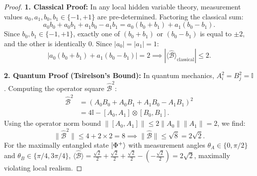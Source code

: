 \begin{proof}
\textbf{1. Classical Proof:}
In any local hidden variable theory, measurement values $a_0, a_1, b_0, b_1 \in \{-1, +1\}$ are pre-determined. Factoring the classical sum:
\begin{equation}
    a_0 b_0 + a_0 b_1 + a_1 b_0 - a_1 b_1 = a_0(b_0 + b_1) + a_1(b_0 - b_1).
\end{equation}
Since $b_0, b_1 \in \{-1, +1\}$, exactly one of $(b_0 + b_1)$ or $(b_0 - b_1)$ is equal to $\pm 2$, and the other is identically $0$. Since $|a_0| = |a_1| = 1$:
\begin{equation}
    |a_0(b_0 + b_1) + a_1(b_0 - b_1)| = 2 \implies |\langle \hat{\mathcal{B}} \rangle_{\text{classical}}| \le 2.
\end{equation}

\textbf{2. Quantum Proof (Tsirelson's Bound):}
In quantum mechanics, $A_i^2 = B_j^2 = \mathbb{I}$. Computing the operator square $\hat{\mathcal{B}}^2$:
\begin{align}
    \hat{\mathcal{B}}^2 &= (A_0 B_0 + A_0 B_1 + A_1 B_0 - A_1 B_1)^2 \nonumber \\
    &= 4\mathbb{I} - [A_0, A_1] \otimes [B_0, B_1].
\end{align}
Using the operator norm bound $\|[A_0, A_1]\| \le 2 \|A_0\| \|A_1\| = 2$, we find:
\begin{equation}
    \|\hat{\mathcal{B}}^2\| \le 4 + 2 \times 2 = 8 \implies \|\hat{\mathcal{B}}\| \le \sqrt{8} = 2\sqrt{2}.
\end{equation}
For the maximally entangled state $\ket{\Phi^+}$ with measurement angles $\theta_A \in \{0, \pi/2\}$ and $\theta_B \in \{\pi/4, 3\pi/4\}$, $\langle \hat{\mathcal{B}} \rangle = \frac{\sqrt{2}}{2} + \frac{\sqrt{2}}{2} + \frac{\sqrt{2}}{2} - (-\frac{\sqrt{2}}{2}) = 2\sqrt{2}$, maximally violating local realism.
\end{proof}


